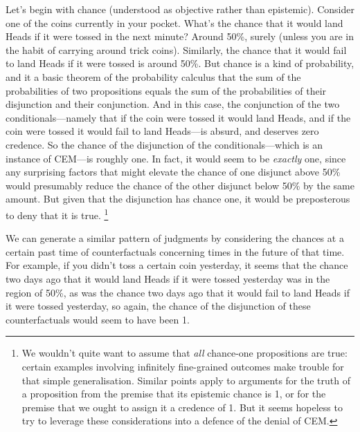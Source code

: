 \documentclass[If.tex]{subfiles}
\begin{document}
Let's begin with chance (understood as objective rather than epistemic). Consider one of the coins currently in your pocket. What's the chance that it would land Heads if it were tossed in the next minute? Around 50\%, surely (unless you are in the habit of carrying around trick coins). Similarly, the chance that it would fail to land Heads if it were tossed is around 50\%. But chance is a kind of probability, and it a basic theorem of the probability calculus that the sum of the probabilities of two propositions equals the sum of the probabilities of their disjunction and their conjunction. And in this case, the conjunction of the two conditionals---namely that if the coin were tossed it would land Heads, and if the coin were tossed it would fail to land Heads---is absurd, and deserves zero credence. So the chance of the disjunction of the conditionals---which is an instance of CEM---is roughly one. In fact, it would seem to be \emph{exactly} one, since any surprising factors that might elevate the chance of one disjunct above 50\% would presumably reduce the chance of the other disjunct below 50\% by the same amount. But given that the disjunction has chance one, it would be preposterous to deny that it is true.%
\footnote{We wouldn't quite want to assume that \emph{all} chance-one propositions are true: certain examples involving infinitely fine-grained outcomes make trouble for that simple generalisation. Similar points apply to arguments for the truth of a proposition from the premise that its epistemic chance is 1, or for the premise that we ought to assign it a credence of 1. But it seems hopeless to try to leverage these considerations into a defence of the denial of CEM.}


We can generate a similar pattern of judgments by considering the chances at a certain past time of counterfactuals concerning times in the future of that time. For example, if you didn't toss a certain coin yesterday, it seems that the chance two days ago that it would land Heads if it were tossed yesterday was in the region of 50\%, as was the chance two days ago that it would fail to land Heads if it were tossed yesterday, so again, the chance of the disjunction of these counterfactuals would seem to have been 1.
\end{document}
